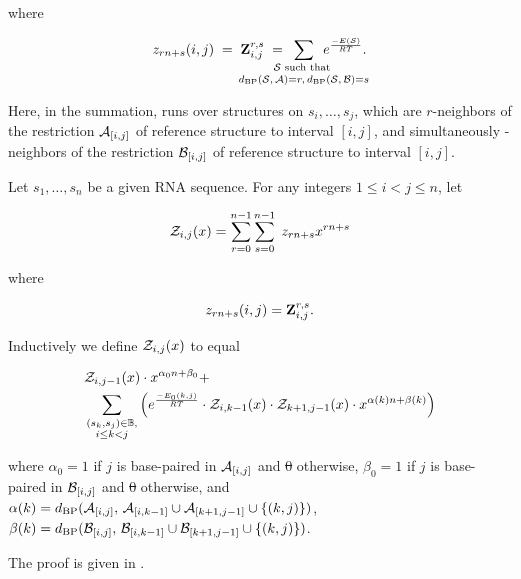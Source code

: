 \documentclass[11pt, oneside]{Thesis} %
\providecommand{\DIFadd}[1]{{\protect\color{blue}\uwave{#1}}} %
\providecommand{\DIFdel}[1]{{\protect\color{red}\sout{#1}}}                      %
\providecommand{\DIFaddbegin}{} %
\providecommand{\DIFaddend}{} %
\providecommand{\DIFdelbegin}{} %
\providecommand{\DIFdelend}{} %
\begin{document}
where

\begin{align}
z_{rn+s}(i,j) \;=\; \bfZ{r,s}{i,j}\;=
\enspace\sum_{\mathclap{\substack{
\str \text{ such that } \rule[-.5ex]{0pt}{0pt} \\
\dBP{\str}{\strA} = r,\,\dBP{\str}{\strB} = s
}}}\enspace
\boltzF{\str}.
\end{align}

Here, in the summation, \str runs over structures on $s_i,\dots,s_j$, which
are $r$-neighbors of the restriction $\mathcal A_{[i,j]}$ of reference structure
\strA to interval $[i,j]$, and simultaneously
\DIFdelbegin %
\DIFdelend \DIFaddbegin \DIFadd{$s$}\DIFaddend -neighbors of the restriction $\mathcal B_{[i,j]}$ of reference structure
\strB to interval $[i,j]$.

\begin{theorem}
\label{thm:ffttwo:recursions}
Let $s_1,\dots,s_n$ be a given RNA sequence.
For any integers $1 \leq i < j \leq n$, let

\begin{align}
{\mathcal Z}_{i,j}(x) = \sum_{r=0}^{n-1} \sum_{s=0}^{n-1}\; z_{rn+s} x^{rn+s}
\end{align}

where

\begin{align}
z_{rn+s}(i,j) = {\bf Z}^{r,s}_{i,j}.
\end{align}

Inductively we define ${\mathcal Z}_{i,j}(x)$ to equal

\begin{align}
\label{eq:ffttwo:polyRecNussJac}
\begin{split}
&\emZof{i,j-1}{x} \cdot x^{\alpha_0n+\beta_0} + \\
&\sum_{\substack{(s_k,s_j) \in \bpSet,\\i\le k<j}}
\left(\boltzNuss{k,j}\cdot
\emZof{i,k-1}{x} \cdot \emZof{k+1,j-1}{x}\cdot x^{\alpha(k)n+\beta(k)} \right)
\end{split}
\end{align}

where $\alpha_0 = 1$ if $j$ is base-paired in $\mathcal A_{[i,j]}$ and \DIFdelbegin \DIFdel{0 }\DIFdelend \DIFaddbegin \DIFadd{$0$ }\DIFaddend otherwise,
$\beta_0 = 1$ if $j$ is base-paired in $\mathcal B_{[i,j]}$ and \DIFdelbegin \DIFdel{0 }\DIFdelend \DIFaddbegin \DIFadd{$0$ }\DIFaddend otherwise, and
$\alpha(k) =
d_{\text{BP}}(\mathcal A_{[i,j]},\,\mathcal A_{[i,k-1]} \cup \mathcal A_{[k+1,j-1]} \cup \{ (k,j) \})$,
$\beta(k) =
d_{\text{BP}}(\mathcal B_{[i,j]},\,\mathcal B_{[i,k-1]} \cup \mathcal B_{[k+1,j-1]} \cup \{ (k,j) \})$.

The proof is given in .
\end{theorem}
\end{document}
